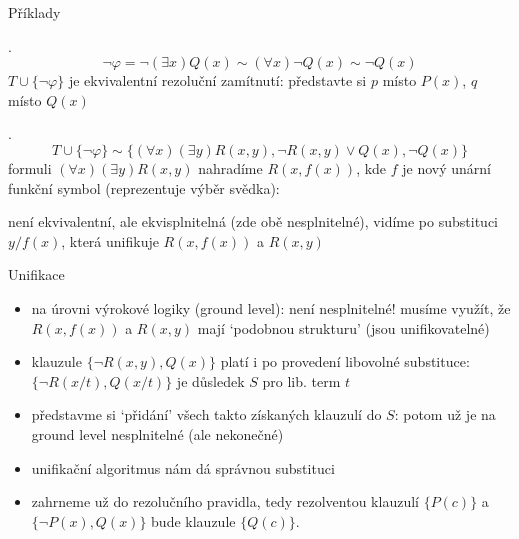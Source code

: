\documentclass{beamer}
\begin{document}
\begin{frame}{Příklady}
    
    . 
    \pause
    $$\neg\varphi=\neg(\exists x)Q(x)\sim(\forall x)\neg Q(x)\sim\neg Q(x)$$ 
    \pause
    $T\cup\{\neg \varphi\}$ je \alert{ekvivalentní} 
    \pause
    rezoluční zamítnutí: představte si $p$ místo $P(x)$, $q$ místo $Q(x)$

    . 
    \pause
    $$
    T\cup\{\neg \varphi\}\sim\{(\forall x)(\exists y)R(x,y),\neg R(x,y)\lor Q(x),\neg Q(x)\}
    $$
    \pause
    formuli \alert{$(\forall x)(\exists y)R(x,y)$} nahradíme \alert{$R(x,f(x))$}, kde $f$ je nový unární funkční symbol (reprezentuje \alert{výběr svědka}):

    \pause

    \pause
    není ekvivalentní, ale \alert{ekvisplnitelná} (zde obě nesplnitelné), vidíme po \alert{substituci $y/f(x)$}, která \alert{unifikuje} $R(x,f(x))$ a $R(x,y)$
 
\end{frame}


\begin{frame}{Unifikace}

    \pause

    \pause
    \begin{itemize}[<+->]
        \item na \alert{úrovni výrokové logiky} (\alert{ground level}):
        není nesplnitelné! musíme využít, že $R(x,f(x))$ a $R(x,y)$ mají `podobnou strukturu' (jsou \alert{unifikovatelné})
        \item klauzule $\{\neg R(x,y),Q(x)\}$ platí i po provedení libovolné substituce: \alert{$\{\neg R(x/t),Q(x/t)\}$} je důsledek $S$ pro lib. term $t$
        \item představme si `přidání' všech takto získaných klauzulí do $S$: potom už je na ground level nesplnitelné (ale nekonečné)
        \item \alert{unifikační algoritmus} nám dá správnou substituci 
        \item zahrneme už do \alert{rezolučního pravidla}, tedy \alert{rezolventou} klauzulí $\{P(c)\}$ a $\{\neg P(x),Q(x)\}$ bude klauzule $\{Q(c)\}$.
    \end{itemize}
 
\end{frame}
\end{document}
